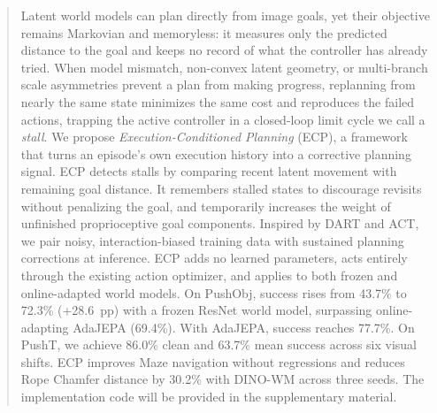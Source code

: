 \begin{abstract}
Latent world models can plan directly from image goals, yet their objective remains Markovian and memoryless: it measures only the predicted distance to the goal and keeps no record of what the controller has already tried. When model mismatch, non-convex latent geometry, or multi-branch scale asymmetries prevent a plan from making progress, replanning from nearly the same state minimizes the same cost and reproduces the failed actions, trapping the active controller in a closed-loop limit cycle we call a \emph{stall}. We propose \emph{Execution-Conditioned Planning} (ECP), a framework that turns an episode's own execution history into a corrective planning signal. ECP detects stalls by comparing recent latent movement with remaining goal distance. It remembers stalled states to discourage revisits without penalizing the goal, and temporarily increases the weight of unfinished proprioceptive goal components. Inspired by DART and ACT, we pair noisy, interaction-biased training data with sustained planning corrections at inference. ECP adds no learned parameters, acts entirely through the existing action optimizer, and applies to both frozen and online-adapted world models. On PushObj, success rises from 43.7\% to 72.3\% (+28.6~pp) with a frozen ResNet world model, surpassing online-adapting AdaJEPA (69.4\%). With AdaJEPA, success reaches 77.7\%. On PushT, we achieve 86.0\% clean and 63.7\% mean success across six visual shifts. ECP improves Maze navigation without regressions and reduces Rope Chamfer distance by 30.2\% with DINO-WM across three seeds. The implementation code will be provided in the supplementary material.
\end{abstract}
